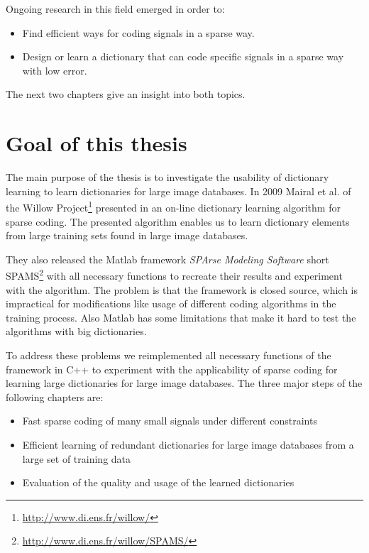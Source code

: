 Ongoing research in this field emerged in order to:
\begin{itemize}
 \item Find efficient ways for coding signals in a sparse way.
 \item Design or learn a dictionary that can code specific signals in
a sparse way with low error.
\end{itemize}
The next two chapters give an insight into both topics. 


\section{Goal of this thesis}
The main purpose of the thesis is to investigate the usability of dictionary
learning to learn dictionaries for large image databases. 
In 2009 Mairal et al. of the Willow
Project\footnote{\url{http://www.di.ens.fr/willow/}} presented in
\cite{Mairal2009,Mairal2010} an on-line dictionary learning algorithm for sparse
coding. The presented algorithm enables us to learn dictionary elements from
large training sets found in large image databases.

They also released the Matlab framework \emph{SPArse Modeling Software}
short SPAMS\footnote{\url{http://www.di.ens.fr/willow/SPAMS/}} with all
necessary functions to recreate their results and experiment with the algorithm.
The problem is that the framework is closed source, which is impractical for
modifications like usage of different coding algorithms in the training process.
Also Matlab has some limitations that make it hard to test the algorithms with
big dictionaries.

To address these problems we reimplemented all necessary functions of the
framework in C++ to experiment with the applicability of sparse coding for
learning large dictionaries for large image databases. The three major steps of
the following chapters are:

\begin{itemize}
 \item Fast sparse coding of many small signals under different constraints
 \item Efficient learning of redundant dictionaries for large image databases
from a large set of training data
 \item Evaluation of the quality and usage of the learned dictionaries
\end{itemize}

